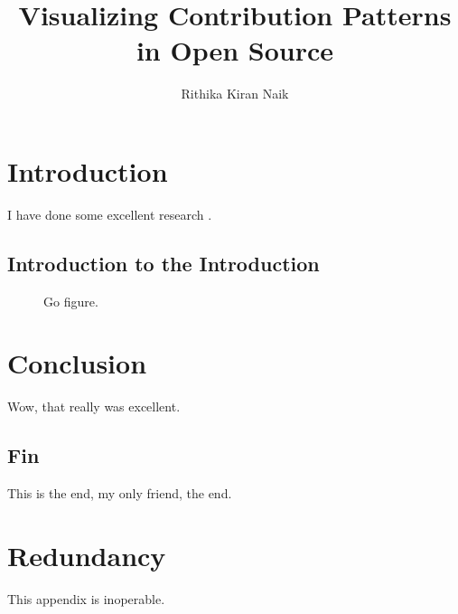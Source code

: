 \documentclass[onehalf,11pt]{beavtex}
\title{Visualizing Contribution Patterns in Open Source}
\author{Rithika Kiran Naik}
\begin{document}
\maketitle

\mainmatter

\chapter{Introduction}
I have done some excellent research \cite{matrix}.
\section{Introduction to the Introduction}
\begin{figure}[!ht]
\centering
{}
\caption{Go figure.}
\end{figure}


\chapter{Conclusion}
Wow, that really was excellent.
\section{Fin}
This is the end, my only friend, the end.





\appendix
\chapter{Redundancy}
This appendix is inoperable.
\end{document}
